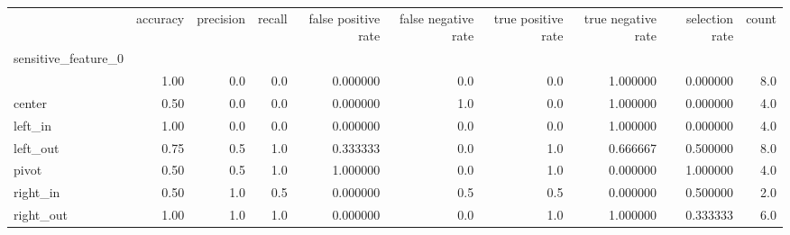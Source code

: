 \begin{tabular}{lrrrrrrrrr}
\toprule
{} &  accuracy &  precision &  recall &  false positive rate &  false negative rate &  true positive rate &  true negative rate &  selection rate &  count \\
sensitive\_feature\_0 &           &            &         &                      &                      &                     &                     &                 &        \\
\midrule
                    &      1.00 &        0.0 &     0.0 &             0.000000 &                  0.0 &                 0.0 &            1.000000 &        0.000000 &    8.0 \\
center              &      0.50 &        0.0 &     0.0 &             0.000000 &                  1.0 &                 0.0 &            1.000000 &        0.000000 &    4.0 \\
left\_in             &      1.00 &        0.0 &     0.0 &             0.000000 &                  0.0 &                 0.0 &            1.000000 &        0.000000 &    4.0 \\
left\_out            &      0.75 &        0.5 &     1.0 &             0.333333 &                  0.0 &                 1.0 &            0.666667 &        0.500000 &    8.0 \\
pivot               &      0.50 &        0.5 &     1.0 &             1.000000 &                  0.0 &                 1.0 &            0.000000 &        1.000000 &    4.0 \\
right\_in            &      0.50 &        1.0 &     0.5 &             0.000000 &                  0.5 &                 0.5 &            0.000000 &        0.500000 &    2.0 \\
right\_out           &      1.00 &        1.0 &     1.0 &             0.000000 &                  0.0 &                 1.0 &            1.000000 &        0.333333 &    6.0 \\
\bottomrule
\end{tabular}
